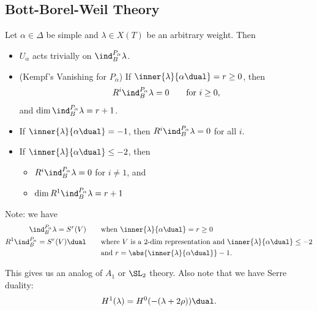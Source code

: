 \hypertarget{bott-borel-weil-theory}{%
\subsection{Bott-Borel-Weil Theory}\label{bott-borel-weil-theory}}

\begin{proposition}[?]

Let \(\alpha\in\Delta\) be simple and \(\lambda \in X(T)\) be an
arbitrary weight. Then

\begin{itemize}
\item
  \(U_\alpha\) acts trivially on \(\ind_B^{P_\alpha} \lambda\).
\item
  (Kempf's Vanishing for \(P_\alpha\)) If
  \(\inner{\lambda}{\alpha\dual} = r \geq 0\), then
  \begin{align*}  
  R^i \ind_B^{P_\alpha} \lambda = 0 \qquad \text{for } i \geq 0
  ,\end{align*} and \(\dim \ind_B^{P_\alpha}\lambda = r + 1\).
\item
  If \(\inner{\lambda}{\alpha\dual} = -1\), then
  \(R^i \ind_B^{P_\alpha} \lambda = 0\) for all \(i\).
\item
  If \(\inner{\lambda}{\alpha\dual} \leq -2\), then

  \begin{itemize}
  \item
    \(R^i \ind_B^{P_\alpha} \lambda = 0\) for \(i \neq 1\), and
  \item
    \(\dim R^1 \ind_B^{P_\alpha} \lambda = r+1\)
  \end{itemize}
\end{itemize}

Note: we have
\begin{align*}  
\ind_B^{P_\alpha} \lambda = S^r(V) \qquad &\text{when } \inner{\lambda}{\alpha\dual} = r \geq 0 \\
R^1 \ind_B^{P_\alpha} = S^r(V)\dual \qquad&\text{where $V$ is a 2-dim representation and } \inner{\lambda}{\alpha\dual} \leq -2 \\
&\text{and } r = \abs{\inner{\lambda}{\alpha\dual}} - 1
.\end{align*}

\end{proposition}

This gives us an analog of \(A_1\) or \(\SL_2\) theory. Also note that
we have Serre duality:
\begin{align*}  
H^1(\lambda) = H^0( - (\lambda + 2\rho) )\dual
.\end{align*}


